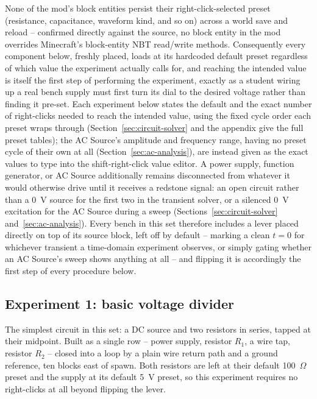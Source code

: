 None of the mod's block entities persist their right-click-selected preset (resistance,
capacitance, waveform kind, and so on) across a world save and reload -- confirmed directly
against the source, no block entity in the mod overrides Minecraft's block-entity NBT
read/write methods. Consequently every component below, freshly placed, loads at its
hardcoded default preset regardless of which value the experiment actually calls for, and
reaching the intended value is itself the first step of performing the experiment, exactly
as a student wiring up a real bench supply must first turn its dial to the desired voltage
rather than finding it pre-set. Each experiment below states the default and the exact
number of right-clicks needed to reach the intended value, using the fixed cycle order each
preset wraps through (Section~\ref{sec:circuit-solver} and the appendix give the full preset
tables); the AC Source's amplitude and frequency range, having no preset cycle of their own
at all (Section~\ref{sec:ac-analysis}), are instead given as the exact values to type into
the shift-right-click value editor. A power supply, function generator, or AC Source
additionally remains disconnected from whatever it would otherwise drive until it receives a
redstone signal: an open circuit rather than a 0~V source for the first two in the transient
solver, or a silenced 0~V excitation for the AC Source during a sweep
(Sections~\ref{sec:circuit-solver} and~\ref{sec:ac-analysis}). Every bench in this set
therefore includes a lever placed directly on top of its source block, left off by default --
marking a clean $t=0$ for whichever transient a time-domain experiment observes, or simply
gating whether an AC Source's sweep shows anything at all -- and flipping it is accordingly
the first step of every procedure below.

\subsection{Experiment 1: basic voltage divider}
\label{sec:exp-divider}

The simplest circuit in this set: a DC source and two resistors in series, tapped at their
midpoint. Built as a single row -- power supply, resistor $R_1$, a wire tap, resistor $R_2$
-- closed into a loop by a plain wire return path and a ground reference, ten blocks east of
spawn. Both resistors are left at their default 100~$\Omega$ preset and the supply at its
default 5~V preset, so this experiment requires no right-clicks at all beyond flipping the
lever.

